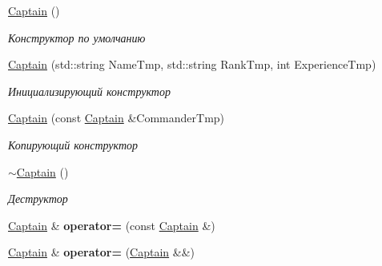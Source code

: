 \begin{DoxyCompactItemize}
\item 
\mbox{\label{struct_aircraft_carrier_group_1_1_captain_a6be7a710b2a305ce8670e834bf138102}} 
\mbox{\hyperlink{struct_aircraft_carrier_group_1_1_captain_a6be7a710b2a305ce8670e834bf138102}{Captain}} ()
\begin{DoxyCompactList}\small\item\em Конструктор по умолчанию \end{DoxyCompactList}\item 
\mbox{\hyperlink{struct_aircraft_carrier_group_1_1_captain_aa9c0ef2175bb1bc073f96ae0cf8094a1}{Captain}} (std\+::string Name\+Tmp, std\+::string Rank\+Tmp, int Experience\+Tmp)
\begin{DoxyCompactList}\small\item\em Инициализирующий конструктор \end{DoxyCompactList}\item 
\mbox{\hyperlink{struct_aircraft_carrier_group_1_1_captain_a52f1e94e696b2ac771c74f6c684f6a22}{Captain}} (const \mbox{\hyperlink{struct_aircraft_carrier_group_1_1_captain}{Captain}} \&Commander\+Tmp)
\begin{DoxyCompactList}\small\item\em Копирующий конструктор \end{DoxyCompactList}\item 
\mbox{\label{struct_aircraft_carrier_group_1_1_captain_a5729193b600c718a41ac57180fd8d61f}} 
\mbox{\hyperlink{struct_aircraft_carrier_group_1_1_captain_a5729193b600c718a41ac57180fd8d61f}{$\sim$\+Captain}} ()
\begin{DoxyCompactList}\small\item\em Деструктор \end{DoxyCompactList}\item 
\mbox{\label{struct_aircraft_carrier_group_1_1_captain_af9a3be6c6d93cdbbcd8297f324ecfd00}} 
\mbox{\hyperlink{struct_aircraft_carrier_group_1_1_captain}{Captain}} \& {\bfseries operator=} (const \mbox{\hyperlink{struct_aircraft_carrier_group_1_1_captain}{Captain}} \&)
\item 
\mbox{\label{struct_aircraft_carrier_group_1_1_captain_aad6dbdeaadb51d01d4cf28a20c345ada}} 
\mbox{\hyperlink{struct_aircraft_carrier_group_1_1_captain}{Captain}} \& {\bfseries operator=} (\mbox{\hyperlink{struct_aircraft_carrier_group_1_1_captain}{Captain}} \&\&)
\end{DoxyCompactItemize}
